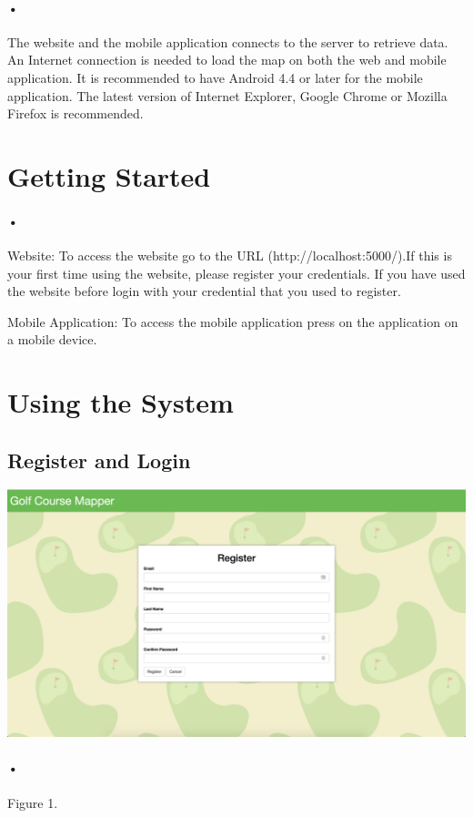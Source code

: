 \documentclass{article}
\begin{document}
	\paragraph{•}
	  The website and the mobile application connects to the server to retrieve data. An Internet connection is needed to load the map on both the web and mobile application. It is recommended to have Android 4.4 or later for the mobile application. The latest version of Internet Explorer, Google Chrome or Mozilla Firefox is recommended.
	
	\section{Getting Started}
	\paragraph{•}
	
	Website: To access the website go to the URL (http://localhost:5000/).If this is your first time using the website, please register your credentials. If you have used the website before login with your credential that you used to register. 
	
	Mobile Application: To access the mobile application press on the application on a mobile device.
	\section{Using the System}
	
	\subsection{Register and Login}
	\includegraphics[scale=0.25]{Register}
	\paragraph{•}
    Figure 1.
\end{document}
